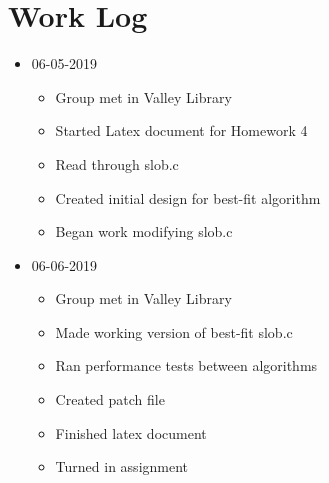 \section{Work Log}
\begin{itemize}
\item 06-05-2019
	\begin{itemize}
	\item Group met in Valley Library
    \item Started Latex document for Homework 4
    \item Read through slob.c
    \item Created initial design for best-fit algorithm
    \item Began work modifying slob.c
	\end{itemize}
\item 06-06-2019
	\begin{itemize}
	\item Group met in Valley Library
	\item Made working version of best-fit slob.c
    \item Ran performance tests between algorithms
    \item Created patch file
    \item Finished latex document
    \item Turned in assignment
	\end{itemize}
\end{itemize}